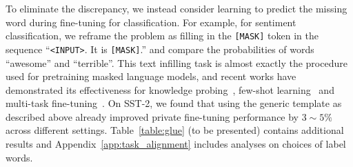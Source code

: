 To eliminate the discrepancy, we instead consider learning to predict the missing word during fine-tuning for classification. 
For example, for sentiment classification, we reframe the problem as filling in the \texttt{[MASK]} token in the sequence ``\texttt{<INPUT>}. It is \texttt{[MASK]}.'' and compare the probabilities of words ``awesome'' and ``terrible''.
This text infilling task is almost exactly the procedure used for pretraining masked language models, and recent works have demonstrated its effectiveness for knowledge probing~\citep{petroni2019language}, few-shot learning~\citep{gao2020making} and multi-task fine-tuning~\citep{wei2021finetuned}. 
On SST-2, we found that using the generic template as described above already improved private fine-tuning performance by $3\sim5\%$ across different settings.
Table~\ref{table:glue} (to be presented) contains additional results and Appendix~\ref{app:task_alignment} includes analyses on choices of label words.


